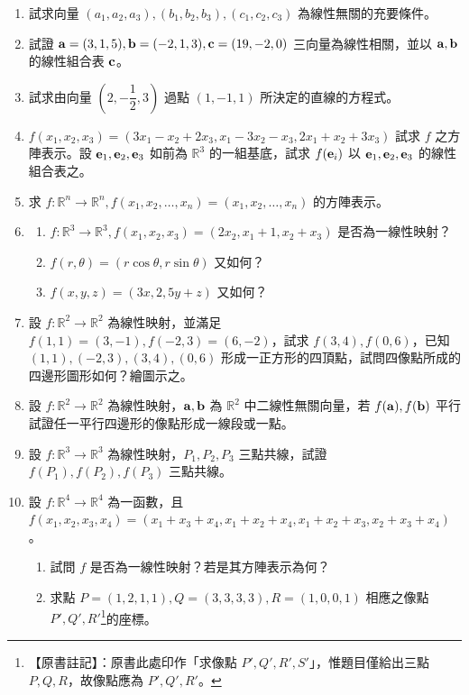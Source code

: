 \begin{enumerate}[label=\arabic*., leftmargin=2em]
  \item 試求向量 $(a_1, a_2, a_3), (b_1, b_2, b_3), (c_1, c_2, c_3)$ 為線性無關的充要條件。

  \item 試證 $\boldsymbol{\mathbf{a}}=(3, 1, 5), \boldsymbol{\mathbf{b}}=(-2, 1, 3), \boldsymbol{\mathbf{c}}=(19, -2, 0)$ 三向量為線性相關，並以 $\boldsymbol{\mathbf{a}}, \boldsymbol{\mathbf{b}}$ 的線性組合表 $\boldsymbol{\mathbf{c}}$。

  \item 試求由向量 $\left(2, -\dfrac{1}{2}, 3\right)$ 過點 $(1, -1, 1)$ 所決定的直線的方程式。

  \item $f(x_1, x_2, x_3) = (3x_1 - x_2 + 2x_3, x_1 - 3x_2 - x_3, 2x_1 + x_2 + 3x_3)$ 試求 $f$ 之方陣表示。設 $\boldsymbol{\mathbf{e}}_1, \boldsymbol{\mathbf{e}}_2, \boldsymbol{\mathbf{e}}_3$ 如前為 $\mathbb{R}^3$ 的一組基底，試求 $f(\boldsymbol{\mathbf{e}}_i)$ 以 $\boldsymbol{\mathbf{e}}_1, \boldsymbol{\mathbf{e}}_2, \boldsymbol{\mathbf{e}}_3$ 的線性組合表之。

  \item 求 $f: \mathbb{R}^n \longrightarrow \mathbb{R}^n, f(x_1, x_2, \dots, x_n) = (x_1, x_2, \dots, x_n)$ 的方陣表示。

  \item
  \begin{enumerate}[label=(\alph*)]
    \item $f: \mathbb{R}^3 \longrightarrow \mathbb{R}^3, f(x_1, x_2, x_3) = (2x_2, x_1 + 1, x_2 + x_3)$ 是否為一線性映射？
    \item $f(r, \theta) = (r\cos\theta, r\sin\theta)$ 又如何？
    \item $f(x, y, z) = (3x, 2, 5y + z)$ 又如何？
  \end{enumerate}

  \item 設 $f: \mathbb{R}^2 \longrightarrow \mathbb{R}^2$ 為線性映射，並滿足 $f(1, 1) = (3, -1), f(-2, 3) = (6, -2)$，試求 $f(3, 4), f(0, 6)$，已知 $(1, 1), (-2, 3), (3, 4), (0, 6)$ 形成一正方形的四頂點，試問四像點所成的四邊形圖形如何？繪圖示之。

  \item 設 $f: \mathbb{R}^2 \longrightarrow \mathbb{R}^2$ 為線性映射，$\boldsymbol{\mathbf{a}}, \boldsymbol{\mathbf{b}}$ 為 $\mathbb{R}^2$ 中二線性無關向量，若 $f(\boldsymbol{\mathbf{a}}), f(\boldsymbol{\mathbf{b}})$ 平行試證任一平行四邊形的像點形成一線段或一點。

  \item 設 $f: \mathbb{R}^3 \longrightarrow \mathbb{R}^3$ 為線性映射，$P_1, P_2, P_3$ 三點共線，試證 $f(P_1), f(P_2), f(P_3)$ 三點共線。

  \item 設 $f: \mathbb{R}^4 \longrightarrow \mathbb{R}^4$ 為一函數，且 $f(x_1, x_2, x_3, x_4) = (x_1 + x_3 + x_4, x_1 + x_2 + x_4, x_1 + x_2 + x_3, x_2 + x_3 + x_4)$。
  \begin{enumerate}[label=(\alph*)]
    \item 試問 $f$ 是否為一線性映射？若是其方陣表示為何？
    \item 求點 $P=(1, 2, 1, 1), Q=(3, 3, 3, 3), R=(1, 0, 0, 1)$ 相應之像點 $P', Q', R'$\label{note:b6-ch1-p22-ex28-s}\footnote{【原書註記】：原書此處印作「求像點 $P', Q', R', S'$」，惟題目僅給出三點 $P, Q, R$，故像點應為 $P', Q', R'$。}的座標。
  \end{enumerate}


\end{enumerate}
